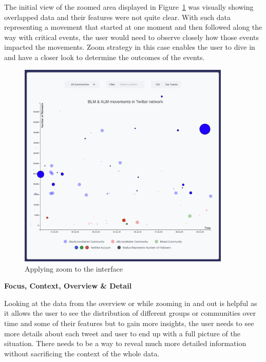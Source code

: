 The initial view of the zoomed area displayed in Figure~\ref{fig:e-zoom} was visually showing overlapped data and their features were not quite clear. With such data representing a movement that started at one moment and then followed along the way with critical events, the user would need to observe closely how those events impacted the movements. Zoom strategy in this case enables the user to dive in and have a closer look to determine the outcomes of the events.

\begin{figure}[H]
\centering
\captionsetup{justification=centering}
\includegraphics[width=0.9\textwidth]{./pics/zoom.png}
\caption{Applying zoom to the interface}
\label{fig:e-zoom}
\end{figure}



\textbf{Focus, Context, Overview \& Detail}

Looking at the data from the overview or while zooming in and out is helpful as it allows the user to see the distribution of different groups or communities over time and some of their features but to gain more insights, the user needs to see more details about each tweet and user to end up with a full picture of the situation. There needs to be a way to reveal much more detailed information without sacrificing the context of the whole data. 


